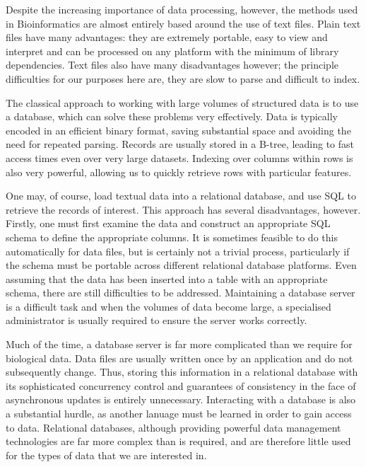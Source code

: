 \documentclass{bioinfo}
\begin{document}
Despite the increasing importance of data processing, however, the methods 
used in Bioinformatics are almost entirely 
based around the use of text files. Plain text files have many advantages:
they are extremely portable, easy to view and interpret and can be processed on 
any platform with the minimum of library dependencies. Text files also 
have many disadvantages however; the principle difficulties for our 
purposes here are, they are slow to parse and difficult to index.


The classical approach to working with large volumes of 
structured data is to use a database, which can solve these 
problems very effectively.
Data is typically encoded in an efficient binary 
format, saving substantial space and avoiding the need
for repeated parsing. Records are usually stored in a
B-tree, leading to fast access times even 
over very large datasets. Indexing over columns within rows is 
also very powerful, allowing us to quickly retrieve 
rows with particular features. 


One may, of course, load textual data into a relational database, and 
use SQL to retrieve the records of interest. This approach has several 
disadvantages, however. Firstly, one must first examine the data 
and construct an appropriate SQL schema to define the appropriate columns. 
It is sometimes feasible to do this automatically 
for data files, but is certainly not a trivial process, 
particularly if the schema 
must be portable across different relational database platforms.
Even assuming that the data 
has been inserted into a table with an appropriate schema, there 
are still difficulties to be addressed. Maintaining a database 
server is a difficult task and when the volumes of data become
large, a specialised administrator is usually required to 
ensure the server works correctly.

Much of the time, a database server is far more complicated than
we require for biological data. Data files 
are usually written once by an application 
and do not subsequently change. Thus, storing this information 
in a relational database with its sophisticated concurrency control
and guarantees of consistency in the face of asynchronous updates
is entirely unnecessary. Interacting with a database is also a
substantial hurdle, as another lanuage must be learned in order 
to gain access to data. Relational databases, although providing 
powerful data management technologies are far more complex than 
is required, and are therefore little used for the types of 
data that we are interested in.
\end{document}
